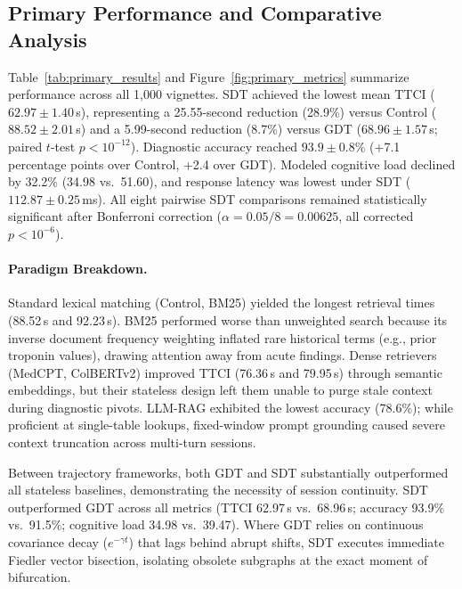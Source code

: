 \documentclass[10pt, onecolumn]{article}
\begin{document}
\subsection{Primary Performance and Comparative Analysis}
Table~\ref{tab:primary_results} and Figure~\ref{fig:primary_metrics} summarize performance across all 1{,}000 vignettes. SDT achieved the lowest mean TTCI ($62.97 \pm 1.40$\,s), representing a 25.55-second reduction (28.9\%) versus Control ($88.52 \pm 2.01$\,s) and a 5.99-second reduction (8.7\%) versus GDT ($68.96 \pm 1.57$\,s; paired $t$-test $p < 10^{-12}$). Diagnostic accuracy reached $93.9 \pm 0.8\%$ (+7.1 percentage points over Control, +2.4 over GDT). Modeled cognitive load declined by 32.2\% (34.98 vs.\ 51.60), and response latency was lowest under SDT ($112.87 \pm 0.25$\,ms). All eight pairwise SDT comparisons remained statistically significant after Bonferroni correction ($\alpha = 0.05/8 = 0.00625$, all corrected $p < 10^{-6}$).

\paragraph{Paradigm Breakdown.}
Standard lexical matching (Control, BM25) yielded the longest retrieval times (88.52\,s and 92.23\,s). BM25 performed worse than unweighted search because its inverse document frequency weighting inflated rare historical terms (e.g., prior troponin values), drawing attention away from acute findings. Dense retrievers (MedCPT, ColBERTv2) improved TTCI (76.36\,s and 79.95\,s) through semantic embeddings, but their stateless design left them unable to purge stale context during diagnostic pivots. LLM-RAG exhibited the lowest accuracy (78.6\%); while proficient at single-table lookups, fixed-window prompt grounding caused severe context truncation across multi-turn sessions.

Between trajectory frameworks, both GDT and SDT substantially outperformed all stateless baselines, demonstrating the necessity of session continuity. SDT outperformed GDT across all metrics (TTCI 62.97\,s vs.\ 68.96\,s; accuracy 93.9\% vs.\ 91.5\%; cognitive load 34.98 vs.\ 39.47). Where GDT relies on continuous covariance decay ($e^{-\gamma t}$) that lags behind abrupt shifts, SDT executes immediate Fiedler vector bisection, isolating obsolete subgraphs at the exact moment of bifurcation.
\end{document}
